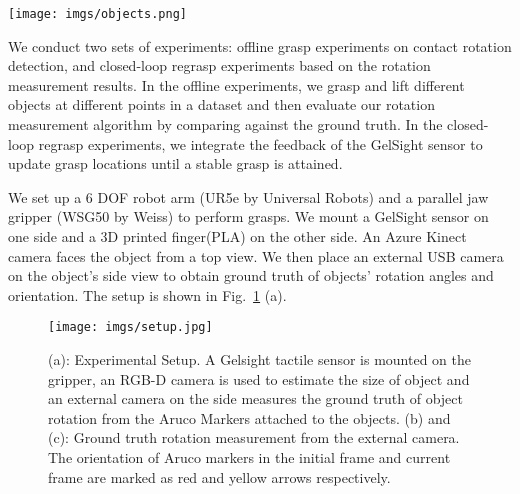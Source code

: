 \begin{figure*}[t]
\texttt{[image: imgs/objects.png]}
\caption{Experimental objects with different shapes, mass distributions and materials. For effective evaluation, we include objects of irregular shapes like spatula, wrench, etc. as well as soft objects like sponge bar, tooth paste, etc.} 
\label{fig:objects}
\end{figure*}

We conduct two sets of experiments: offline grasp experiments on contact rotation detection, and closed-loop regrasp experiments based on the rotation measurement results. In the offline experiments, we grasp and lift different objects at different points in a  dataset and then evaluate our rotation measurement algorithm by comparing against the ground truth. In the closed-loop regrasp experiments, we integrate the feedback of the GelSight sensor to update grasp locations until a stable grasp is attained. 

We set up a 6 DOF robot arm (UR5e by Universal Robots) and a parallel jaw gripper (WSG50 by Weiss) to perform grasps. We mount a GelSight sensor on one side and a 3D printed finger(PLA) on the other side. An Azure Kinect camera faces the object from a top view. We then place an external USB camera on the object's side view to obtain ground truth of objects' rotation angles and orientation. The setup is shown in Fig.~\ref{fig:robot} (a).
\begin{figure}[!htbp]
    \centering
    \texttt{[image: imgs/setup.jpg]}
    \caption{(a): Experimental Setup. A Gelsight tactile sensor is mounted on the gripper, an RGB-D camera is used to estimate the size of object and an external camera on the side measures the ground truth of object rotation from the Aruco Markers attached to the objects. (b) and (c): Ground truth rotation measurement from the external camera. The orientation of Aruco markers in the initial frame and current frame are marked as red and yellow arrows respectively.}
    \label{fig:robot}
     \vspace{-2mm}
\end{figure}


